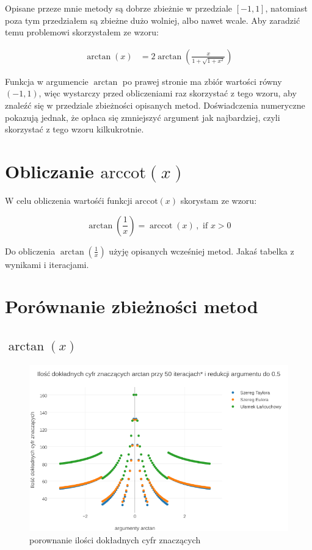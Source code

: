 \documentclass{article}
\begin{document}
Opisane przeze mnie metody są dobrze zbieżnie w przedziale $[-1,1]$, natomiast poza tym przedziałem są zbieżne dużo wolniej, albo nawet wcale.
Aby zaradzić temu problemowi skorzystałem ze wzoru:

\begin{equation}
	{\begin{aligned}\arctan(x)&=2\arctan \left({\frac {x}{1+{\sqrt {1+x^{2}}}}}\right)\end{aligned}}
\end{equation}

Funkcja w argumencie $\arctan$ po prawej stronie ma zbiór wartości równy $(-1,1)$, więc wystarczy przed obliczeniami raz skorzystać z tego wzoru, aby znaleźć się w przedziale zbieżności opisanych metod.
Doświadczenia numeryczne pokazują jednak, że opłaca się zmniejszyć argument jak najbardziej, czyli skorzystać z tego wzoru kilkukrotnie.

\section{Obliczanie $\textrm{arccot}(x)$}
W celu obliczenia wartośći funkcji $\textrm{arccot}(x)$ skorystam ze wzoru:

\begin{equation}
\arctan \left({\frac {1}{x}}\right)=\operatorname {arccot}(x)\,,{\text{ if }}x>0
\end{equation}

Do obliczenia $\arctan(\frac{1}{x})$ użyję opisanych wcześniej metod.
Jakaś tabelka z wynikami i iteracjami.

\section{Porównanie zbieżności metod}
\subsection{$\arctan(x)$}
\FloatBarrier
	\begin{figure}[]
		\includegraphics[width=\textwidth,scale=0.5]{atan_znaczace.png}
		\caption{porownanie ilości dokładnych cyfr znaczących}
		\label{wskaźnik uwarunkowania}
	\end{figure}
\FloatBarrier
\end{document}
